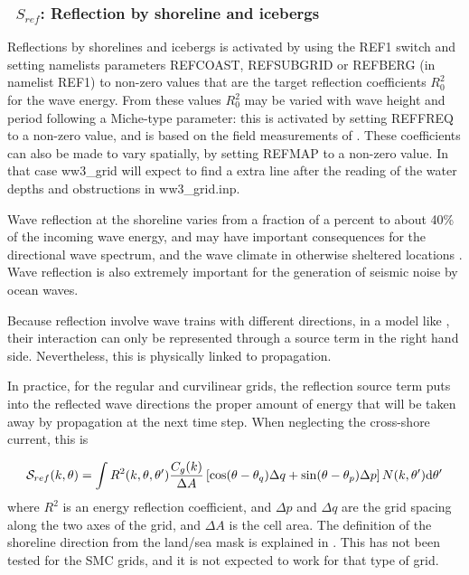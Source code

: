 \vsssub
\subsubsection{~$S_{ref}$: Reflection by shoreline and icebergs} \label{sec:REF1}
\vsssub


\noindent 
Reflections by shorelines and icebergs is activated by using the REF1 switch 
and setting namelists
parameters REFCOAST, REFSUBGRID or REFBERG (in namelist REF1) to non-zero
values that are the target reflection coefficients $R_0^2$ for the wave
energy.  From these values $R_0^2$ may be varied with wave height and period
following a Miche-type parameter: this is activated by setting REFFREQ to a
non-zero value, and is based on the field measurements of \cite{art:EHG94}.
These coefficients can also be made to vary spatially, by setting REFMAP to a
non-zero value. In that case ww3\_grid will expect to find a extra line after
the reading of the water depths and obstructions in ww3\_grid.inp.

Wave reflection at the shoreline varies from a fraction of a percent to about
40\% of the incoming wave energy, and may have important consequences for the
directional wave spectrum, and the wave climate in otherwise sheltered
locations \citep{pro:ORe99}. Wave reflection is also extremely important for
the generation of seismic noise by ocean waves.

Because reflection involve wave trains with different directions, in a model
like \ws, their interaction can only be represented through a source term in
the right hand side. Nevertheless, this is physically linked to propagation.

In practice, for the regular and curvilinear grids, the reflection source term puts into the
reflected wave directions the proper amount of energy that will be taken away
by propagation at the next time step. When neglecting the cross-shore current,
this is

\begin{equation} 
{\cal S}_{ref}(k,\theta) = 
\int R^2(k,\theta,\theta') \frac{C_g(k)}{\Delta A} \left[\cos (\theta-\theta_q) \Delta q + \sin (\theta-\theta_p)  \Delta p \right] N(k,\theta') \mathrm{d} \theta'
\end{equation}
where $R^2$ is an energy reflection coefficient, and $\Delta p$ and $\Delta q$
are the grid spacing along the two axes of the grid,  and $\Delta A$ is the cell area. The
definition of the shoreline direction from the land/sea mask is explained in
\cite{art:Aea11}. This has not been tested for the SMC grids, and it is not expected to work for 
that type of grid.  

